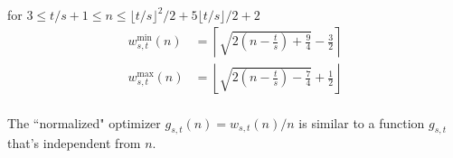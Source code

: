 \documentclass[]{article}
\begin{document}
\vspace{1cm}
\begin{lemma} for $3\leq t/s +1 \leq n \leq \lfloor t/s\rfloor^2/2+5\lfloor t/s\rfloor / 2 +2$
	\begin{align*}
		w^{\min}_{s,t}(n) &= \left\lceil \sqrt{2\left(n-\frac{t}{s}\right)+\frac{9}{4}}-\frac{3}{2} \right\rceil\\
		w^{\max}_{s,t}(n) &= \left\lfloor \sqrt{2\left(n-\frac{t}{s}\right)-\frac{7}{4}}+\frac{1}{2} \right\rfloor\\
	\end{align*}
\end{lemma}

\vspace{1cm}
\begin{lemma}[Guide]
	The ``normalized" optimizer $g_{s,t}(n) = w_{s,t}(n)/n$ is similar to a function $g_{s,t}$ that's independent from $n$.
\end{lemma}
\end{document}
